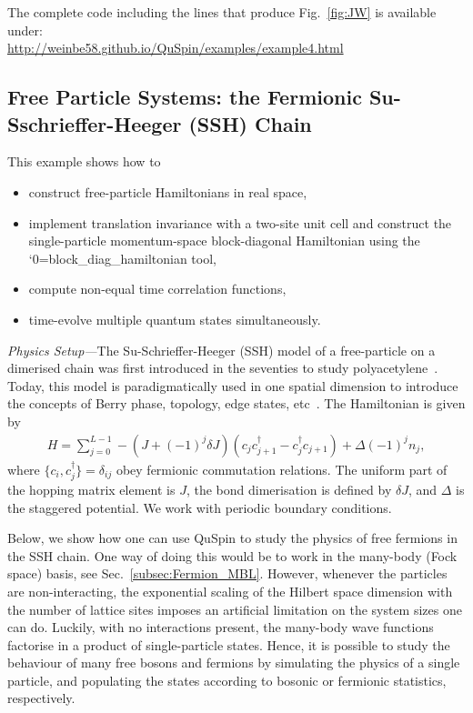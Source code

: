 \documentclass{SciPost}
\newcommand\0{\scalebox{-1}[1]{0}}
\let\svttfamily\ttfamily
\renewcommand\ttfamily{\svttfamily\catcode`0=\active }
\renewcommand\texttt{\bgroup\ttfamily\texttthelp}
\def\texttthelp#1{#1\egroup}
\begin{document}
The complete code including the lines that produce Fig.~\ref{fig:JW} is available under:\\

\href{http://weinbe58.github.io/QuSpin/examples/example4.html}{http://weinbe58.github.io/QuSpin/examples/example4.html}\\


\subsection{Free Particle Systems: the Fermionic Su-Sschrieffer-Heeger (SSH) Chain}

\label{subsec:SSH_model}

This example shows how to
\begin{itemize}
	\item construct free-particle Hamiltonians in real space,
	\item implement translation invariance with a two-site unit cell and construct the single-particle momentum-space block-diagonal Hamiltonian using the \texttt{block\_diag\_hamiltonian} tool,
	\item compute non-equal time correlation functions,
	\item time-evolve multiple quantum states simultaneously.
\end{itemize}

\noindent\emph{Physics Setup---}The Su-Schrieffer-Heeger (SSH) model of a free-particle on a dimerised chain was first introduced in the seventies to study polyacetylene~\cite{SSH_1,SSH_2,SSH_2_E}. Today, this model is paradigmatically used in one spatial dimension to introduce the concepts of Berry phase, topology, edge states, etc~\cite{asboth2016short}. The Hamiltonian is given by
\begin{eqnarray}
H = \sum_{j=0}^{L-1} -(J+(-1)^j\delta J)\left(c_jc^\dagger_{j+1} - c^\dagger_{j}c_{j+1}\right) + \Delta(-1)^jn_j, 
\label{eq:SSH}
\end{eqnarray}
where $\{c_i,c^\dagger_j\}=\delta _{ij}$ obey fermionic commutation relations. The uniform part of the hopping matrix element is $J$, the bond dimerisation is defined by $\delta J$, and $\Delta$ is the staggered potential. We work with periodic boundary conditions.

Below, we show how one can use QuSpin to study the physics of free fermions in the SSH chain. One way of doing this would be to work in the many-body (Fock space) basis, see Sec.~\ref{subsec:Fermion_MBL}. However, whenever the particles are non-interacting, the exponential scaling of the Hilbert space dimension with the number of lattice sites imposes an artificial limitation on the system sizes one can do. Luckily, with no interactions present, the many-body wave functions factorise in a product of single-particle states. Hence, it is possible to study the behaviour of many free bosons and fermions by simulating the physics of a single particle, and populating the states according to bosonic or fermionic statistics, respectively.
\end{document}
